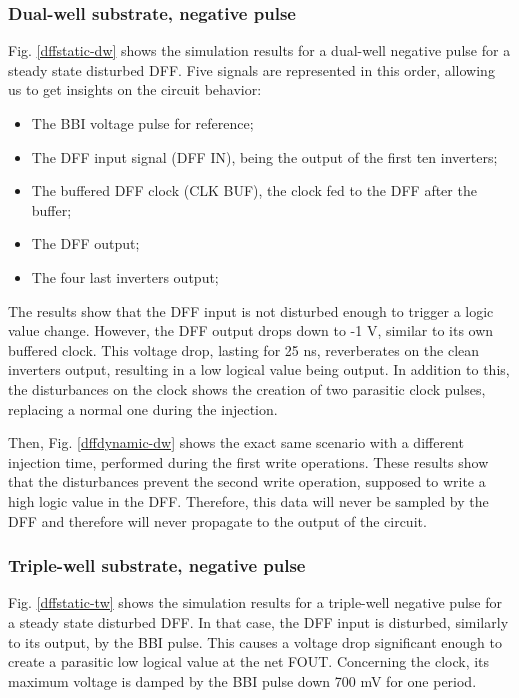 	\subsubsection{Dual-well substrate, negative pulse}
		
		Fig. \ref{dffstatic-dw} shows the simulation results for a dual-well negative pulse for a steady state disturbed DFF.
		Five signals are represented in this order, allowing us to get insights on the circuit behavior:
		\begin{itemize}
			\item The BBI voltage pulse for reference;
			\item The DFF input signal (DFF IN), being the output of the first ten inverters;
			\item The buffered DFF clock (CLK BUF), the clock fed to the DFF after the buffer;
			\item The DFF output;
			\item The four last inverters output;
		\end{itemize}
		The results show that the DFF input is not disturbed enough to trigger a logic value change.
		However, the DFF output drops down to -1 V, similar to its own buffered clock.
		This voltage drop, lasting for 25 ns, reverberates on the clean inverters output, resulting in a low logical value being output.
		In addition to this, the disturbances on the clock shows the creation of two parasitic clock pulses, replacing a normal one during the injection.
		
		
		Then, Fig. \ref{dffdynamic-dw} shows the exact same scenario with a different injection time, performed during the first write operations.
		These results show that the disturbances prevent the second write operation, supposed to write a high logic value in the DFF.
		Therefore, this data will never be sampled by the DFF and therefore will never propagate to the output of the circuit.
	
	\subsubsection{Triple-well substrate, negative pulse}
		
		Fig. \ref{dffstatic-tw} shows the simulation results for a triple-well negative pulse for a steady state disturbed DFF.
		In that case, the DFF input is disturbed, similarly to its output, by the BBI pulse.
		This causes a voltage drop significant enough to create a parasitic low logical value at the net FOUT.
		Concerning the clock, its maximum voltage is damped by the BBI pulse down 700 mV for one period.
		
